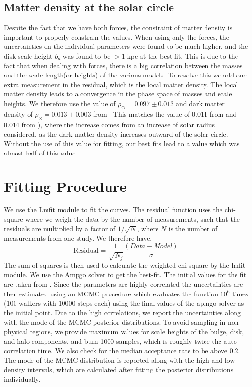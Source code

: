 \documentclass[fleqn,usenatbib]{mnras}
\begin{document}
\subsection{Matter density at the solar circle}
Despite the fact that we have both forces, the constraint of matter density is important to properly constrain the values. When using only the forces, the uncertainties on the individual parameters were found to be much higher, and the disk scale height $b_d$ was found to be $>1$ kpc at the best fit. This is due to the fact that when dealing with forces, there is a big correlation between the masses and the scale length(or heights) of the various models. To resolve this we add one extra measurement in the residual, which is the local matter density. The local matter density leads to a convergence in the phase space of masses and scale heights. We therefore use the value of $\rho_\odot = 0.097 \pm 0.013$ and dark matter density of $\rho_\odot = 0.013 \pm 0.003$ from \citet{2015ApJ...814...13M}. This matches the value of 0.011 from \citet{2010A&A...523A..83S} and 0.014 from \citet{2014A&A...571A..92B}), where the increase comes from an increase of solar radius considered, as the dark matter density increases outward of the solar circle. Without the use of this value for fitting, our best fits lead to a value which was almost half of this value.
\section{Fitting Procedure}

We use the Lmfit module \citep{newville_matthew_2014_11813} to fit the curves. The residual function uses the chi-square where we weigh the data by the number of measurements, such that the residuals are multiplied by a factor of $1/\sqrt{N}$, where $N$ is the number of measurements from one study. We therefore have,
\begin{equation}
    \text{Residual}= \frac{1}{\sqrt{N_j}}\frac{(Data-Model)}{\sigma}
\end{equation}
The sum of squares is then used to calculate the weighted chi-square by the lmfit module.
We use the Ampgo solver to get the best-fit. The initial values for the fit are taken from \citet{andreassmass}. Since the parameters are highly correlated the uncertainties are then estimated using an MCMC procedure which evaluates the function $10^6$ times (100 walkers with 10000 steps each) using the final values of the apmgo solver as the initial point. Due to the high correlations, we report the uncertainties along with the mode of the MCMC posterior distributions. To avoid sampling in non-physical regions, we provide maximum values for scale heights of the bulge, disk, and halo components, and burn 1000 samples, which is roughly twice the auto-correlation time. We also check for the median acceptance rate to be above 0.2. The mode of the MCMC distribution is reported along with the high and low density intervals, which are calculated after fitting the posterior distributions individually.
\end{document}
